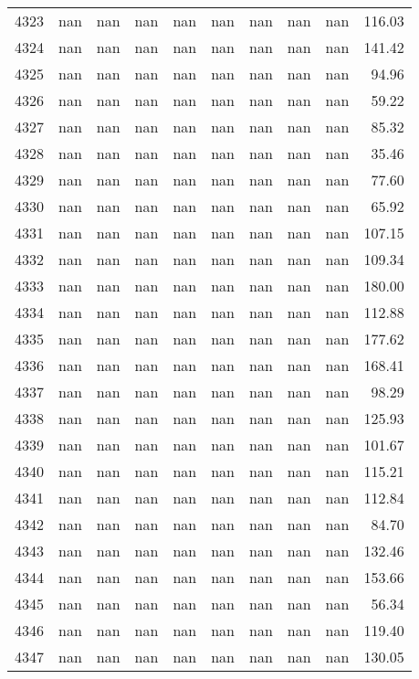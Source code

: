 \begin{tabular}{lrrrrrrrrr}
4323 & nan & nan & nan & nan & nan & nan & nan & nan & 116.03 \\
4324 & nan & nan & nan & nan & nan & nan & nan & nan & 141.42 \\
4325 & nan & nan & nan & nan & nan & nan & nan & nan & 94.96 \\
4326 & nan & nan & nan & nan & nan & nan & nan & nan & 59.22 \\
4327 & nan & nan & nan & nan & nan & nan & nan & nan & 85.32 \\
4328 & nan & nan & nan & nan & nan & nan & nan & nan & 35.46 \\
4329 & nan & nan & nan & nan & nan & nan & nan & nan & 77.60 \\
4330 & nan & nan & nan & nan & nan & nan & nan & nan & 65.92 \\
4331 & nan & nan & nan & nan & nan & nan & nan & nan & 107.15 \\
4332 & nan & nan & nan & nan & nan & nan & nan & nan & 109.34 \\
4333 & nan & nan & nan & nan & nan & nan & nan & nan & 180.00 \\
4334 & nan & nan & nan & nan & nan & nan & nan & nan & 112.88 \\
4335 & nan & nan & nan & nan & nan & nan & nan & nan & 177.62 \\
4336 & nan & nan & nan & nan & nan & nan & nan & nan & 168.41 \\
4337 & nan & nan & nan & nan & nan & nan & nan & nan & 98.29 \\
4338 & nan & nan & nan & nan & nan & nan & nan & nan & 125.93 \\
4339 & nan & nan & nan & nan & nan & nan & nan & nan & 101.67 \\
4340 & nan & nan & nan & nan & nan & nan & nan & nan & 115.21 \\
4341 & nan & nan & nan & nan & nan & nan & nan & nan & 112.84 \\
4342 & nan & nan & nan & nan & nan & nan & nan & nan & 84.70 \\
4343 & nan & nan & nan & nan & nan & nan & nan & nan & 132.46 \\
4344 & nan & nan & nan & nan & nan & nan & nan & nan & 153.66 \\
4345 & nan & nan & nan & nan & nan & nan & nan & nan & 56.34 \\
4346 & nan & nan & nan & nan & nan & nan & nan & nan & 119.40 \\
4347 & nan & nan & nan & nan & nan & nan & nan & nan & 130.05 \\

\end{tabular}
